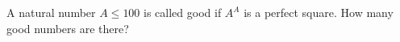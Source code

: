 A natural number $A\leqslant100$ is called good if $A^{A}$ is a perfect square. How many good numbers are there?
